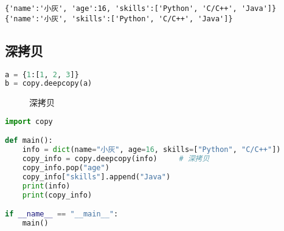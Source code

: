 \begin{tcolorbox}
    \begin{verbatim}
{'name':'小灰', 'age':16, 'skills':['Python', 'C/C++', 'Java']}
{'name':'小灰', 'skills':['Python', 'C/C++', 'Java']}
\end{verbatim}
\end{tcolorbox}

\vspace{0.5cm}

\subsection{深拷贝}

\vspace{-0.5cm}

\begin{lstlisting}[language=Python]
a = {1:[1, 2, 3]}
b = copy.deepcopy(a)
\end{lstlisting}

\begin{figure}[H]
    \centering
    \caption{深拷贝}
\end{figure}

\vspace{0.5cm}


\begin{lstlisting}[language=Python]
import copy

def main():
    info = dict(name="小灰", age=16, skills=["Python", "C/C++"])
    copy_info = copy.deepcopy(info)     # 深拷贝
    copy_info.pop("age")
    copy_info["skills"].append("Java")
    print(info)
    print(copy_info)

if __name__ == "__main__":
    main()
\end{lstlisting}

